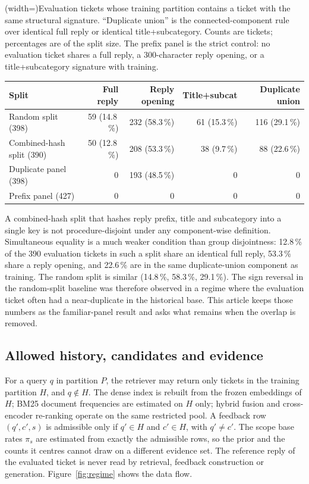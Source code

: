 \documentclass{ieeeaccess}
\begin{document}
\Table[!btp](width=\textwidth){Evaluation tickets whose training partition contains
a ticket with the same structural signature. ``Duplicate union'' is the
connected-component rule over identical full reply or identical title+subcategory.
Counts are tickets; percentages are of the split size. The prefix panel is the
strict control: no evaluation ticket shares a full reply, a 300-character reply
opening, or a title+subcategory signature with training.\label{tab:overlap}}{
\begin{tabular}{@{}lrrrr@{}}
\toprule
Split & Full reply & Reply opening & Title+subcat & Duplicate union \\
\midrule
Random split (398)   & 59 (14.8\,\%) & 232 (58.3\,\%) & 61 (15.3\,\%) & 116 (29.1\,\%) \\
Combined-hash split (390) & 50 (12.8\,\%) & 208 (53.3\,\%) & 38 (9.7\,\%) & 88 (22.6\,\%) \\
Duplicate panel (398)    & 0 & 193 (48.5\,\%) & 0 & 0 \\
Prefix panel (427)       & 0 & 0 & 0 & 0 \\
\bottomrule
\end{tabular}}

A combined-hash split that hashes reply prefix, title and subcategory into a
single key is not procedure-disjoint under any component-wise definition.
Simultaneous equality is a much weaker condition than group disjointness: 12.8\,\%
of the 390 evaluation tickets in such a split share an identical full reply,
53.3\,\% share a reply opening, and 22.6\,\% are in the same duplicate-union
component as training. The random split is similar (14.8\,\%, 58.3\,\%, 29.1\,\%).
The sign reversal in the random-split baseline was therefore observed in a regime
where the evaluation ticket often had a near-duplicate in the historical base. This article keeps those numbers as the familiar-panel result and
asks what remains when the overlap is removed.

\subsection{Allowed history, candidates and evidence}
For a query $q$ in partition $P$, the retriever may return only tickets in the
training partition $H$, and $q \notin H$. The dense index is rebuilt from the
frozen embeddings of $H$; BM25 document frequencies are estimated on $H$ only;
hybrid fusion and cross-encoder re-ranking operate on the same restricted pool. A
feedback row $(q',c',s)$ is admissible only if $q' \in H$ and $c' \in H$, with
$q' \neq c'$. The scope base rates $\pi_s$ are estimated from exactly the
admissible rows, so the prior and the counts it centres cannot draw on a different
evidence set. The reference reply of the evaluated ticket is never read by
retrieval, feedback construction or generation. Figure~\ref{fig:regime} shows the
data flow.
\end{document}
